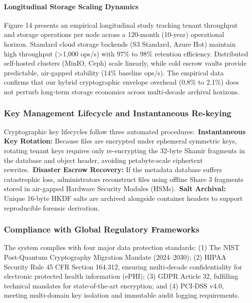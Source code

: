 \documentclass[5p,times]{elsarticle}
\begin{document}
\paragraph{Longitudinal Storage Scaling Dynamics}

Figure 14 presents an empirical longitudinal study tracking tenant throughput and storage operations per node across a 120-month (10-year) operational horizon. Standard cloud storage backends (S3 Standard, Azure Hot) maintain high throughput (>1,000 ops/s) with 97\% to 98\% retention efficiency. Distributed self-hosted clusters (MinIO, Ceph) scale linearly, while cold escrow vaults provide predictable, air-gapped stability (14\% baseline ops/s). The empirical data confirms that our hybrid cryptographic envelope overhead (0.8\% to 2.1\%) does not perturb long-term storage economics across multi-decade archival horizons.


\subsubsection{Key Management Lifecycle and Instantaneous Re-keying}

Cryptographic key lifecycles follow three automated procedures:\newline \textbullet\  \textbf{Instantaneous Key Rotation:} Because files are encrypted under ephemeral symmetric keys, rotating tenant keys requires only re-encrypting the 32-byte Shamir fragments in the database and object header, avoiding petabyte-scale ciphertext rewrites.\newline \textbullet\  \textbf{Disaster Escrow Recovery:} If the metadata database suffers catastrophic loss, administrators reconstruct files using offline Share 3 fragments stored in air-gapped Hardware Security Modules (HSMs).\newline \textbullet\  \textbf{Salt Archival:} Unique 16-byte HKDF salts are archived alongside container headers to support reproducible forensic derivation.


\subsubsection{Compliance with Global Regulatory Frameworks}

The system complies with four major data protection standards: (1) The NIST Post-Quantum Cryptography Migration Mandate (2024--2030); (2) HIPAA Security Rule 45 CFR Section 164.312, ensuring multi-decade confidentiality for electronic protected health information (ePHI); (3) GDPR Article 32, fulfilling technical mandates for state-of-the-art encryption; and (4) PCI-DSS v4.0, meeting multi-domain key isolation and immutable audit logging requirements.
\end{document}
